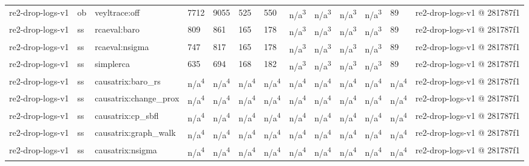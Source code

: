\begin{table}[t]
\begin{tabular}{lllllllllllll}
re2-drop-logs-v1 & ob & veyltrace:off & 7712 & 9055 & 525 & 550 & n/a\textsuperscript{3} & n/a\textsuperscript{3} & n/a\textsuperscript{3} & n/a\textsuperscript{3} & 89 & re2-drop-logs-v1 @ 281787f1 \\
re2-drop-logs-v1 & ss & rcaeval:baro & 809 & 861 & 165 & 178 & n/a\textsuperscript{3} & n/a\textsuperscript{3} & n/a\textsuperscript{3} & n/a\textsuperscript{3} & 89 & re2-drop-logs-v1 @ 281787f1 \\
re2-drop-logs-v1 & ss & rcaeval:nsigma & 747 & 817 & 165 & 178 & n/a\textsuperscript{3} & n/a\textsuperscript{3} & n/a\textsuperscript{3} & n/a\textsuperscript{3} & 89 & re2-drop-logs-v1 @ 281787f1 \\
re2-drop-logs-v1 & ss & simplerca & 635 & 694 & 168 & 182 & n/a\textsuperscript{3} & n/a\textsuperscript{3} & n/a\textsuperscript{3} & n/a\textsuperscript{3} & 89 & re2-drop-logs-v1 @ 281787f1 \\
re2-drop-logs-v1 & ss & causatrix:baro\_rs & n/a\textsuperscript{4} & n/a\textsuperscript{4} & n/a\textsuperscript{4} & n/a\textsuperscript{4} & n/a\textsuperscript{4} & n/a\textsuperscript{4} & n/a\textsuperscript{4} & n/a\textsuperscript{4} & n/a\textsuperscript{4} & re2-drop-logs-v1 @ 281787f1 \\
re2-drop-logs-v1 & ss & causatrix:change\_prox & n/a\textsuperscript{4} & n/a\textsuperscript{4} & n/a\textsuperscript{4} & n/a\textsuperscript{4} & n/a\textsuperscript{4} & n/a\textsuperscript{4} & n/a\textsuperscript{4} & n/a\textsuperscript{4} & n/a\textsuperscript{4} & re2-drop-logs-v1 @ 281787f1 \\
re2-drop-logs-v1 & ss & causatrix:cp\_sbfl & n/a\textsuperscript{4} & n/a\textsuperscript{4} & n/a\textsuperscript{4} & n/a\textsuperscript{4} & n/a\textsuperscript{4} & n/a\textsuperscript{4} & n/a\textsuperscript{4} & n/a\textsuperscript{4} & n/a\textsuperscript{4} & re2-drop-logs-v1 @ 281787f1 \\
re2-drop-logs-v1 & ss & causatrix:graph\_walk & n/a\textsuperscript{4} & n/a\textsuperscript{4} & n/a\textsuperscript{4} & n/a\textsuperscript{4} & n/a\textsuperscript{4} & n/a\textsuperscript{4} & n/a\textsuperscript{4} & n/a\textsuperscript{4} & n/a\textsuperscript{4} & re2-drop-logs-v1 @ 281787f1 \\
re2-drop-logs-v1 & ss & causatrix:nsigma & n/a\textsuperscript{4} & n/a\textsuperscript{4} & n/a\textsuperscript{4} & n/a\textsuperscript{4} & n/a\textsuperscript{4} & n/a\textsuperscript{4} & n/a\textsuperscript{4} & n/a\textsuperscript{4} & n/a\textsuperscript{4} & re2-drop-logs-v1 @ 281787f1 \\

\end{tabular}
\end{table}
